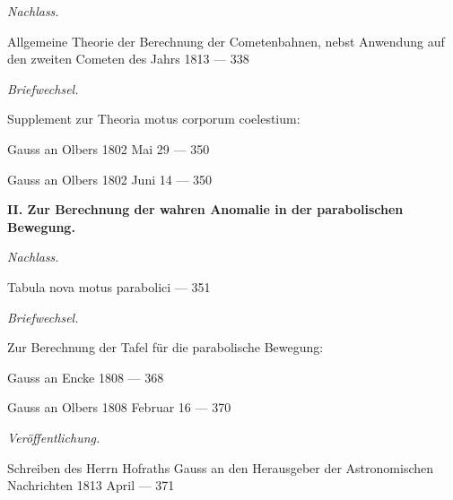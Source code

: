 \documentclass[10pt,a4paper]{article}
\newenvironment{hangparas}[2]{\setlength{\hangindent}{#1}\setlength{\hangafter}{#2}}{}
\begin{document}
\noindent\textit{Nachlass.}

\vspace{0.2em}

\begin{hangparas}{1em}{1}
\noindent Allgemeine Theorie der Berechnung der Cometenbahnen, nebst Anwendung auf den zweiten Cometen des Jahrs 1813 \hfill --- 338
\end{hangparas}

\vspace{0.2em}

\noindent\textit{Briefwechsel.}

\vspace{0.2em}

\begin{hangparas}{1em}{1}
\noindent Supplement zur Theoria motus corporum coelestium:

\noindent\quad Gauss an Olbers 1802 Mai 29 \hfill --- 350

\noindent\quad Gauss an Olbers 1802 Juni 14 \hfill --- 350
\end{hangparas}

\newpage

\begin{hangparas}{1em}{1}
\noindent\textbf{II. Zur Berechnung der wahren Anomalie in der parabolischen Bewegung.}

\vspace{0.2em}

\noindent\textit{Nachlass.}

\noindent Tabula nova motus parabolici \hfill --- 351

\vspace{0.2em}

\noindent\textit{Briefwechsel.}

\noindent Zur Berechnung der Tafel für die parabolische Bewegung:

\noindent\quad Gauss an Encke 1808 \hfill --- 368

\noindent\quad Gauss an Olbers 1808 Februar 16 \hfill --- 370

\vspace{0.2em}

\noindent\textit{Veröffentlichung.}

\noindent Schreiben des Herrn Hofraths Gauss an den Herausgeber der Astronomischen Nachrichten 1813 April \hfill --- 371
\end{hangparas}

\vspace{0.5em}
\end{document}
